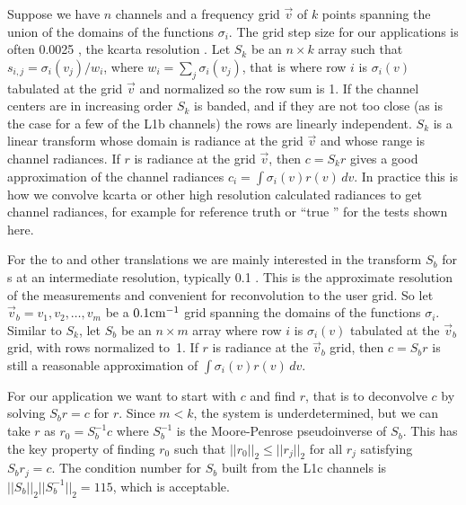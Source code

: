 \documentclass[11pt]{article}
\begin{document}
Suppose we have $n$ channels and a frequency grid $\vec v$ of $k$
points spanning the union of the domains of the functions
$\sigma_i$.  The grid step size for our applications is often 0.0025
{\wn}, the kcarta resolution \cite{kcarta1}.  Let $S_k$ be an
$n\times k$ array such that $s_{i,j} = \sigma_i(v_j)/w_i$, where
$w_i = \sum_j \sigma_i(v_j)$, that is where row $i$ is $\sigma_i(v)$
tabulated at the grid $\vec v$ and normalized so the row sum is 1.
If the channel centers are in increasing order $S_k$ is banded, and
if they are not too close (as is the case for a few of the L1b
channels) the rows are linearly independent.  $S_k$ is a linear
transform whose domain is radiance at the grid $\vec v$ and whose
range is channel radiances.  If $r$ is radiance at the grid $\vec
v$, then $c = S_k r$ gives a good approximation of the channel
radiances $c_i = \int\sigma_i(v)r(v)\,dv$.  In practice this is how
we convolve kcarta or other high resolution calculated radiances to
get {\airs} channel radiances, for example for reference truth or
``true {\airs}'' for the tests shown here.


For the {\airs} to {\cris} and other translations we are mainly
interested in the transform $S_b$ for {\srf}s at an intermediate
resolution, typically 0.1 {\wn}.  This is the approximate resolution
of the {\srf} measurements and convenient for reconvolution to the
{\cris} user grid.  So let $\vec v_b = v_1,v_2,\ldots,v_m$ be a $0.1
\mbox{cm$^{-1}$}$ grid spanning the domains of the functions $\sigma_i$.  Similar
to $S_k$, let $S_b$ be an $n\times m$ array where row $i$ is
$\sigma_i(v)$ tabulated at the $\vec v_b$ grid, with rows normalized
to~1.  If $r$ is radiance at the $\vec v_b$ grid, then $c = S_b r$
is still a reasonable approximation of $\int\sigma_i(v)r(v)\,dv$.

For our application we want to start with $c$ and find $r$, that is
to deconvolve $c$ by solving $S_b r = c$ for $r$.  Since $m < k$,
the system is underdetermined, but we can take $r$ as $r_0 =
S_b^{-1} c$ where $S_b^{-1}$ is the Moore-Penrose pseudoinverse
\cite{pinv} of $S_b$.  This has the key property of finding $r_0$
such that $||r_0||_2 \le ||r_j||_2$ for all $r_j$ satisfying $S_b
r_j = c$.  The condition number for $S_b$ built from the L1c
channels is $||S_b||_2||S_b^{-1}||_2 = 115$, which is acceptable.
\end{document}
